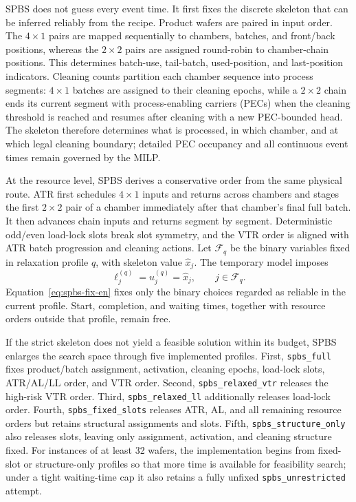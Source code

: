 \documentclass[final,5p,times,twocolumn]{elsarticle}
\begin{document}
SPBS does not guess every event time. It first fixes the discrete skeleton that can be inferred reliably from the recipe. Product wafers are paired in input order. The $4\times1$ pairs are mapped sequentially to chambers, batches, and front/back positions, whereas the $2\times2$ pairs are assigned round-robin to chamber-chain positions. This determines batch-use, tail-batch, used-position, and last-position indicators. Cleaning counts partition each chamber sequence into process segments: $4\times1$ batches are assigned to their cleaning epochs, while a $2\times2$ chain ends its current segment with process-enabling carriers (PECs) when the cleaning threshold is reached and resumes after cleaning with a new PEC-bounded head. The skeleton therefore determines what is processed, in which chamber, and at which legal cleaning boundary; detailed PEC occupancy and all continuous event times remain governed by the MILP.

At the resource level, SPBS derives a conservative order from the same physical route. ATR first schedules $4\times1$ inputs and returns across chambers and stages the first $2\times2$ pair of a chamber immediately after that chamber's final full batch. It then advances chain inputs and returns segment by segment. Deterministic odd/even load-lock slots break slot symmetry, and the VTR order is aligned with ATR batch progression and cleaning actions. Let $\mathcal F_q$ be the binary variables fixed in relaxation profile $q$, with skeleton value $\widehat x_j$. The temporary model imposes
\begin{equation}
\ell_j^{(q)}=u_j^{(q)}=\widehat x_j,\qquad j\in\mathcal F_q .
\label{eq:spbs-fix-en}
\end{equation}
Equation~\eqref{eq:spbs-fix-en} fixes only the binary choices regarded as reliable in the current profile. Start, completion, and waiting times, together with resource orders outside that profile, remain free.

If the strict skeleton does not yield a feasible solution within its budget, SPBS enlarges the search space through five implemented profiles. First, \texttt{spbs\_full} fixes product/batch assignment, activation, cleaning epochs, load-lock slots, ATR/AL/LL order, and VTR order. Second, \texttt{spbs\_relaxed\_vtr} releases the high-risk VTR order. Third, \texttt{spbs\_relaxed\_ll} additionally releases load-lock order. Fourth, \texttt{spbs\_fixed\_slots} releases ATR, AL, and all remaining resource orders but retains structural assignments and slots. Fifth, \texttt{spbs\_structure\_only} also releases slots, leaving only assignment, activation, and cleaning structure fixed. For instances of at least 32 wafers, the implementation begins from fixed-slot or structure-only profiles so that more time is available for feasibility search; under a tight waiting-time cap it also retains a fully unfixed \texttt{spbs\_unrestricted} attempt.
\end{document}
